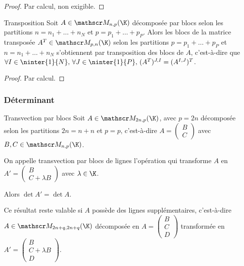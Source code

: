 \begin{proof}
    Par calcul, non exigible.
\end{proof}

\begin{proposition}{Transposition}{}
    Soit $A \in \mathscr M_{n, p}(\K)$ décomposée par blocs selon les partitions $n = n_1 + \dots + n_N$
    et $p = p_1 + \dots + p_P$. Alors les blocs de la matrice transposée $A^T \in \mathscr M_{p, n}(\K)$ selon 
    les partitions $p = p_1 + \dots + p_P$ et $n = n_1 + \dots + n_N$ s'obtiennent 
    par transposition des blocs de $A$, c'est-à-dire que
    $\forall I \in \ninter{1}{N}, \, \forall J \in \ninter{1}{P}, \, (A^T)^{J, I} = (A^{I, J})^T$.
\end{proposition}

\begin{proof}
    Par calcul.
\end{proof}

\subsubsection{Déterminant}

\begin{proposition}{Transvection par blocs}{}
    Soit $A \in \mathscr M_{2n, p}(\K)$, avec $p = 2n$
    décomposée selon les partitions $2n = n + n$ et $p = p$, 
    c'est-à-dire $A = \begin{pmatrix}
        B\\
        C
    \end{pmatrix}$ avec $B, C \in \mathscr M_{n, p}(\K)$.

    On appelle transvection par blocs de lignes l'opération qui transforme 
    $A$ en $A' = \begin{pmatrix}
        B  \\
        C + \lambda B
    \end{pmatrix}$ avec $\lambda \in \K$.

    Alors $\det A' = \det A$.
    
\end{proposition}

\begin{remarque}
    Ce résultat reste valable si $A$ possède des lignes supplémentaires, c'est-à-dire 
    $A \in \mathscr M_{2n + q, 2n + q}(\K)$ décomposée en 
    $A = \begin{pmatrix}
        B \\
        C \\
        D
        \end{pmatrix}$ transformée en $A' = \begin{pmatrix}
        B \\
        C + \lambda B \\
        D
    \end{pmatrix}$.
\end{remarque}

